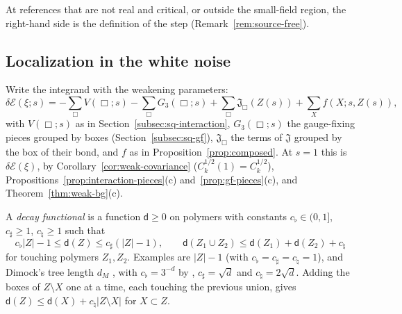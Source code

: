 At references that are not real and critical, or outside the small-field region, the right-hand side is the definition of the step (Remark~\ref{rem:source-free}).

\subsection{Localization in the white noise}\label{subsec:cl-loc}

Write the integrand with the weakening parameters:
\[
\delta\mathcal E(\xi;s)=-\sum_\Box V(\Box;s)-\sum_\Box G_3(\Box;s)+\sum_\Box\mathfrak J_\Box(Z(s))+\sum_Xf(X;s,Z(s)),
\]
with $V(\Box;s)$ as in Section~\ref{subsec:sq-interaction}, $G_3(\Box;s)$ the gauge-fixing pieces grouped by boxes (Section~\ref{subsec:sq-gf}), $\mathfrak J_\Box$ the terms of $\mathfrak J$ grouped by the box of their bond, and $f$ as in Proposition~\ref{prop:composed}. At $s=1$ this is $\delta\mathcal E(\xi)$, by Corollary~\ref{cor:weak-covariance} ($C_k^{1/2}(1)=C_k^{1/2}$), Propositions~\ref{prop:interaction-pieces}(c) and~\ref{prop:gf-pieces}(c), and Theorem~\ref{thm:weak-bg}(c).

\begin{definition}\label{def:decay-functional}
A \emph{decay functional} is a function $\mathsf d\ge0$ on polymers with constants $c_\flat\in(0,1]$, $c_\sharp\ge1$, $c_\natural\ge1$ such that
\[
c_\flat|Z|-1\le\mathsf d(Z)\le c_\sharp(|Z|-1),\qquad\mathsf d(Z_1\cup Z_2)\le\mathsf d(Z_1)+\mathsf d(Z_2)+c_\natural
\]
for touching polymers $Z_1,Z_2$. Examples are $|Z|-1$ (with $c_\flat=c_\sharp=c_\natural=1$), and Dimock's tree length $d_M$ \cite[(119)]{DimockI}, with $c_\flat=3^{-d}$ by \cite[(122)]{DimockI}, $c_\sharp=\sqrt d$ and $c_\natural=2\sqrt d$. Adding the boxes of $Z\setminus X$ one at a time, each touching the previous union, gives $\mathsf d(Z)\le\mathsf d(X)+c_\natural|Z\setminus X|$ for $X\subset Z$.
\end{definition}

